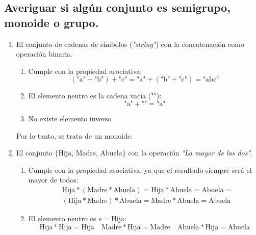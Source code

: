 \subsection{Averiguar si algún conjunto es semigrupo, monoide o grupo.}

\begin{enumerate}
    \item El conjunto de cadenas de símbolos (\textit{"string"}) con la concatenación como operación binaria.

    \begin{enumerate}
        \item Cumple con la propiedad asociativa:
        \begin{equation}
            (\text{"a"} + \text{"b"}) + \text{"c"} = \text{"a"} + (\text{"b"} + \text{"c"}) = \text{"abc"}
        \end{equation}

        \item El elemento neutro es la cadena vacía ($\text{""}$):
        \begin{equation}
            \text{"a"} + \text{""} = \text{"a"}
        \end{equation}

        \item No existe elemento inverso
    \end{enumerate}

    Por lo tanto, se trata de un monoide.

    \item El conjunto $\{\text{Hija, Madre, Abuela}\}$ con la operación \textit{"La mayor de las dos"}.

    \begin{enumerate}
        \item Cumple con la propiedad asociativa, ya que el resultado siempre será el mayor de todos:
        \begin{equation}
            \begin{split}
                & \text{Hija} * (\text{Madre} * \text{Abuela}) = \text{Hija} * \text{Abuela} = \text{Abuela} =\\
                & (\text{Hija} * \text{Madre}) * \text{Abuela} = \text{Madre} * \text{Abuela} = \text{Abuela}
            \end{split}
        \end{equation}

        \item El elemento neutro es $e = \text{Hija}$:
        \begin{equation}
            \text{Hija} * \text{Hija} = \text{Hija} \quad \text{Madre} * \text{Hija} = \text{Madre} \quad \text{Abuela} * \text{Hija} = \text{Abuela}
        \end{equation}


\end{enumerate}
\end{enumerate}
